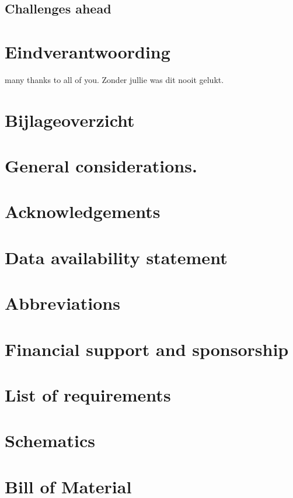 \documentclass{article}
\begin{document}
		\subsection{Challenges ahead}
		
		
		
			\newpage
		\section{Eindverantwoording}
		many thanks to all of you. Zonder jullie was dit nooit gelukt.
		
		\section{Bijlageoverzicht}
		
		
		\newpage
		\section{General considerations.}
		
		\section{Acknowledgements}
		
		\section{Data availability statement}
		
		\section{Abbreviations}
		
		\section{	Financial support and sponsorship}
		
		
		\appendix
		
		
		\section{ List of requirements }
		
		\section{ Schematics }
		
		\section{ Bill of Material }
		
\end{document}
